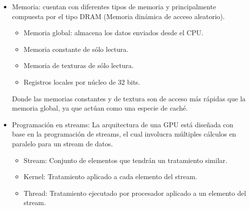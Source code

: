 \begin{itemize}
\item Memoria: cuentan con diferentes tipos de memoria y principalmente compuesta por el tipo DRAM (Memoria dinámica de acceso aleatorio).
	\begin{itemize}
	\item Memoria global: almacena los datos enviados desde el CPU.
	\item Memoria constante de sólo lectura.
	\item Memoria de texturas de sólo lectura.
	\item Registros locales por núcleo de 32 bits. 
	\end{itemize}
Donde las memorias constantes y de textura son de acceso más rápidas que la memoria global, ya que actúan como una especie de caché.

\item Programación en streams: La arquitectura de una GPU está diseñada con base en la programación de streams, el cual involucra múltiples cálculos en paralelo para un stream de datos\cite{stream}. 

	\begin{itemize}
	\item Stream: Conjunto de elementos que tendrán un tratamiento similar.
	\item Kernel: Tratamiento aplicado a cada elemento del stream.
	\item Thread: Tratamiento ejecutado por procesador aplicado a un elemento del stream.
	\end{itemize} 

   


\end{itemize} 
    
